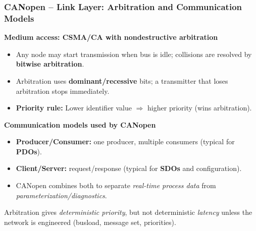 \begin{frame}
	\frametitle{CANopen -- Link Layer: Arbitration and Communication Models}
	\small
	\textbf{Medium access: CSMA/CA with nondestructive arbitration}
	\begin{itemize}
		\item Any node may start transmission when bus is idle; collisions are resolved by \textbf{bitwise arbitration}.
		\item Arbitration uses \textbf{dominant/recessive} bits; a transmitter that loses arbitration stops immediately.
		\item \textbf{Priority rule:} Lower identifier value $\Rightarrow$ higher priority (wins arbitration).
	\end{itemize}
	\textbf{Communication models used by CANopen}
	\begin{itemize}
		\item \textbf{Producer/Consumer:} one producer, multiple consumers (typical for \textbf{PDOs}).
		\item \textbf{Client/Server:} request/response (typical for \textbf{SDOs} and configuration).
		\item CANopen combines both to separate \emph{real-time process data} from \emph{parameterization/diagnostics}.
	\end{itemize}
	\footnotesize
	Arbitration gives \emph{deterministic priority}, but not deterministic \emph{latency} unless the network is engineered (busload, message set, priorities).
\end{frame}

